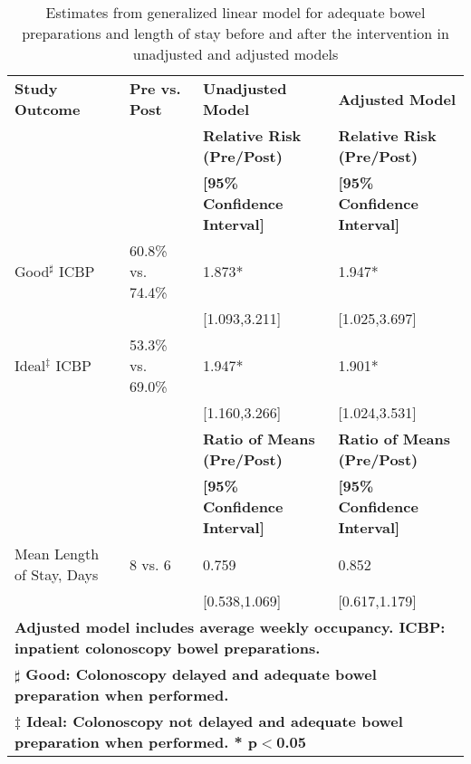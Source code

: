 %
\hypertarget{Estimates from generalized linear model for adequate bowel preparations and length of stay before and after the intervention in unadjusted and adjusted models}{}
 \begin{table}
  \centering
  \caption{Estimates from generalized linear model for adequate bowel preparations and length of stay before and after the intervention in unadjusted and adjusted models}
  \label{table:estimates}
    \begin{tiny}
    \begin{tabular}{llll} \hline
    \textbf{Study Outcome} & \textbf{Pre vs. Post} & \textbf{Unadjusted Model} & \textbf{Adjusted Model} \\
     & & \textbf{Relative Risk (Pre/Post)} & \textbf{Relative Risk (Pre/Post)}\\
     & & \textbf{[95\% Confidence Interval]} & \textbf{[95\% Confidence Interval]}\\ \hline
    Good$^{\sharp}$ ICBP & 60.8\% vs. 74.4\% & 1.873* & 1.947* \\
     & & [1.093,3.211] & [1.025,3.697] \\
    Ideal$^{\ddag}$ ICBP & 53.3\% vs. 69.0\% & 1.947* & 1.901* \\
     & & [1.160,3.266] & [1.024,3.531] \\ \hline
     & & \textbf{Ratio of Means (Pre/Post)} & \textbf{Ratio of Means (Pre/Post)}\\
     & & \textbf{[95\% Confidence Interval]} & \textbf{[95\% Confidence Interval]}\\ \hline
    Mean Length of Stay, Days & 8 vs. 6 & 0.759 & 0.852 \\
     & & [0.538,1.069] & [0.617,1.179] \\ \hline
    \multicolumn{4}{l}{\textbf{Adjusted model includes average weekly occupancy. ICBP: inpatient colonoscopy bowel preparations.}}\\
    \multicolumn{4}{l}{\textbf{$\sharp$ Good: Colonoscopy delayed and adequate bowel preparation when performed. }}\\
    \multicolumn{4}{l}{\textbf{$\ddag$ Ideal: Colonoscopy not delayed and adequate bowel preparation when performed. * p$<$0.05}}\\
    \end{tabular}
    \end{tiny}
 \end{table}
% 